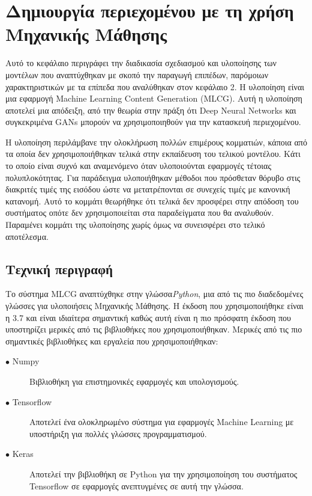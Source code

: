 \thispagestyle{empty}

\chapter{Δημιουργία περιεχομένου με τη χρήση Μηχανικής Μάθησης}

Αυτό το κεφάλαιο περιγράφει την διαδικασία σχεδιασμού και υλοποίησης των μοντέλων που αναπτύχθηκαν με σκοπό την παραγωγή επιπέδων, παρόμοιων χαρακτηριστικών με τα επίπεδα που αναλύθηκαν στον κεφάλαιο 2. Η υλοποίηση είναι μια εφαρμογή Machine Learning Content Generation (MLCG). Αυτή η υλοποίηση αποτελεί μια απόδειξη, από την θεωρία στην πράξη ότι Deep Neural Networks και συγκεκριμένα GANs μπορούν να χρησιμοποιηθούν για την κατασκευή περιεχομένου.
\par
Η υλοποίηση περιλάμβανε την ολοκλήρωση πολλών επιμέρους κομματιών, κάποια από τα οποία δεν χρησιμοποιήθηκαν τελικά στην εκπαίδευση του τελικού μοντέλου. Κάτι το οποίο είναι συχνό και αναμενόμενο όταν υλοποιούνται εφαρμογές τέτοιας πολυπλοκότητας. Για παράδειγμα υλοποιήθηκαν μέθοδοι που πρόσθεταν θόρυβο στις διακριτές τιμές της εισόδου ώστε να μετατρέπονται σε συνεχείς τιμές με κανονική κατανομή. Αυτό το κομμάτι θεωρήθηκε ότι τελικά δεν προσφέρει στην απόδοση του συστήματος οπότε δεν χρησιμοποιείται στα παραδείγματα που θα αναλυθούν. Παραμένει κομμάτι της υλοποίησης χωρίς όμως να συνεισφέρει στο τελικό αποτέλεσμα.

\section{Τεχνική περιγραφή}
Το σύστημα MLCG αναπτύχθηκε στην γλώσσα\textit{Python}, μια από τις πιο διαδεδομένες γλώσσες για υλοποιήσεις Μηχανικής Μάθησης. Η έκδοση που χρησιμοποιήθηκε είναι η 3.7 και είναι ιδιαίτερα σημαντική καθώς αυτή είναι η πιο πρόσφατη έκδοση που υποστηρίζει μερικές από τις βιβλιοθήκες που χρησιμοποιήθηκαν. 
Μερικές από τις πιο σημαντικές βιβλιοθήκες και εργαλεία που χρησιμοποιήθηκαν:

\begin{description}
\item[$\bullet$ Numpy] Βιβλιοθήκη για επιστημονικές εφαρμογές και υπολογισμούς.
\item[$\bullet$ Tensorflow] Αποτελεί ένα ολοκληρωμένο σύστημα για εφαρμογές Machine Learning με υποστήριξη για πολλές γλώσσες προγραμματισμού. 
\item[$\bullet$ Keras] Αποτελεί την βιβλιοθήκη σε Python για την χρησιμοποίηση του συστήματος Tensorflow σε εφαρμογές ανεπτυγμένες σε αυτή την γλώσσα.
\end{description}


